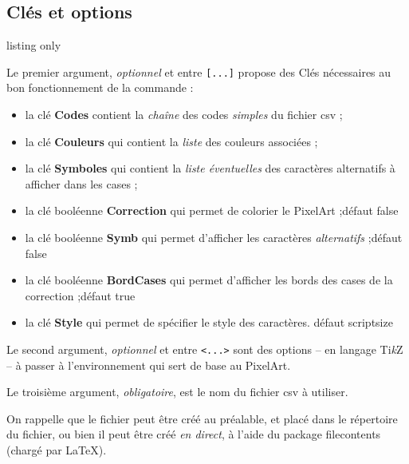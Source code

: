 \documentclass{article}
\newcommand\Cle[1]{{\bfseries\sffamily\textlangle #1\textrangle}}
\begin{document}
\pagebreak

\subsection{Clés et options}

\begin{PresentationCode}{listing only}
\end{PresentationCode}

Le premier argument, \textit{optionnel} et entre \texttt{[...]} propose des \textsf{Clés} nécessaires au bon fonctionnement de la commande :

\begin{itemize}
	\item la clé \Cle{Codes} contient la \textit{chaîne} des codes \textit{simples} du  fichier \textsf{csv} ;
	\item la clé \Cle{Couleurs} qui contient la \textit{liste} des couleurs associées ;
	\item la clé \Cle{Symboles} qui contient la \textit{liste éventuelles} des caractères alternatifs à afficher dans les cases ;
	\item la clé booléenne \Cle{Correction} qui permet de colorier le PixelArt ;\hfill{}défaut \textsf{false}
	\item la clé booléenne \Cle{Symb} qui permet d'afficher les caractères \textit{alternatifs} ;\hfill{}défaut \textsf{false}
	\item la clé booléenne \Cle{BordCases} qui permet d'afficher les bords des cases de la correction ;\hfill{}défaut \textsf{true}
	\item la clé \Cle{Style} qui permet de spécifier le style des caractères. \hfill{}défaut \textsf{scriptsize}
\end{itemize}

Le second argument, \textit{optionnel} et entre \texttt{<...>} sont des options -- en langage Ti\textit{k}Z -- à passer à l'environnement qui sert de base au PixelArt.

\medskip

Le troisième argument, \textit{obligatoire}, est le nom du fichier \textsf{csv} à utiliser.

\vspace{1cm}

On rappelle que le fichier peut être créé au préalable, et placé dans le répertoire du fichier, ou bien il peut être créé \textit{en direct}, à l'aide du package \textsf{filecontents} (chargé par \LaTeX).
\end{document}
